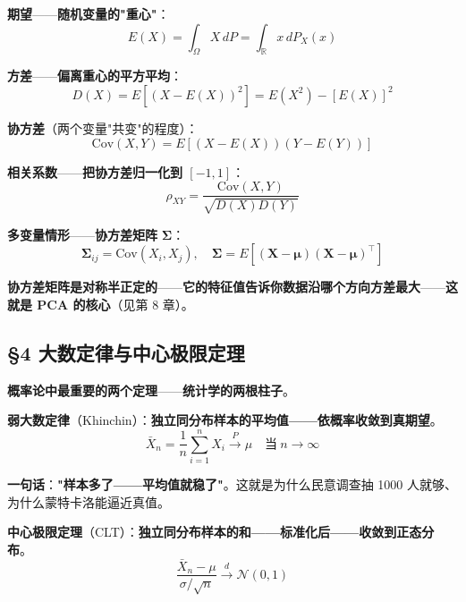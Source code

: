\textbf{期望}——\textbf{随机变量的"重心"}：
\begin{equation}
E(X) = \int_\Omega X \, dP = \int_{\mathbb{R}} x \, dP_X(x)
\end{equation}

\textbf{方差}——\textbf{偏离重心的平方平均}：
\begin{equation}
D(X) = E\!\left[(X-E(X))^2\right] = E(X^2) - [E(X)]^2
\end{equation}

\textbf{协方差}（两个变量"共变"的程度）：
\begin{equation}
\mathrm{Cov}(X,Y) = E[(X - E(X))(Y - E(Y))]
\end{equation}

\textbf{相关系数}——\textbf{把协方差归一化到 $[-1, 1]$}：
\begin{equation}
\rho_{XY} = \frac{\mathrm{Cov}(X,Y)}{\sqrt{D(X)D(Y)}}
\end{equation}

\textbf{多变量情形}——\textbf{协方差矩阵} $\bm{\Sigma}$：
\begin{equation}
\bm{\Sigma}_{ij} = \mathrm{Cov}(X_i, X_j), \quad \bm{\Sigma} = E[(\bm{X}-\bm{\mu})(\bm{X}-\bm{\mu})^\top]
\end{equation}

\textbf{协方差矩阵是对称半正定的}——\textbf{它的特征值告诉你数据沿哪个方向方差最大}——\textbf{这就是 PCA 的核心}（见第 8 章）。

\subsection{§4 大数定律与中心极限定理}

\textbf{概率论中最重要的两个定理}——\textbf{统计学的两根柱子}。

\textbf{弱大数定律}（Khinchin）：\textbf{独立同分布样本的平均值——依概率收敛到真期望}。
\begin{equation}
\bar{X}_n = \frac{1}{n}\sum_{i=1}^n X_i \xrightarrow{P} \mu \quad \text{当}~ n \to \infty
\end{equation}

\textbf{一句话}：\textbf{"样本多了——平均值就稳了"}。这就是为什么民意调查抽 1000 人就够、为什么蒙特卡洛能逼近真值。

\textbf{中心极限定理}（CLT）：\textbf{独立同分布样本的和——标准化后——收敛到正态分布}。
\begin{equation}
\frac{\bar{X}_n - \mu}{\sigma/\sqrt{n}} \xrightarrow{d} \mathcal{N}(0,1)
\end{equation}

